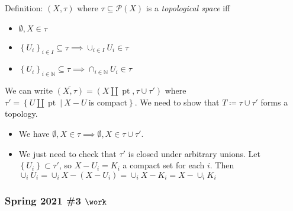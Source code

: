 \begin{concept}

\envlist

Definition: \((X, \tau)\) where \(\tau \subseteq \mathcal P(X)\) is a
\emph{topological space} iff

\begin{itemize}
\tightlist
\item
  \(\emptyset, X \in \tau\)
\item
  \(\left\{{U_i}\right\}_{i\in I} \subseteq \tau \implies \cup_{i\in I} U_i \in \tau\)
\item
  \(\left\{{U_i}\right\}_{i\in {\mathbb{N}}} \subseteq \tau \implies \cap_{i\in {\mathbb{N}}} U_i \in \tau\)
\end{itemize}

\end{concept}

\begin{solution}

\envlist

We can write
\(\overline{(X, \tau)} = (X {\textstyle\coprod}{\operatorname{pt}}, \tau \cup\tau')\)
where
\(\tau' = \left\{{U{\textstyle\coprod}{\operatorname{pt}}{~\mathrel{\Big|}~}X-U ~\text{is compact}}\right\}\).
We need to show that \(T \coloneqq\tau \cup\tau'\) forms a topology.

\begin{itemize}
\tightlist
\item
  We have
  \(\emptyset,X \in \tau \implies \emptyset, X \in \tau \cup\tau'\).
\item
  We just need to check that \(\tau'\) is closed under arbitrary unions.
  Let \(\left\{{U_i}\right\} \subset \tau'\), so \(X-U_i = K_i\) a
  compact set for each \(i\). Then
  \(\cup_{i} U_i = \cup_i X- (X-U_i)= \cup_i X - K_i = X - \cup_i K_i\)
\end{itemize}

\end{solution}

\hypertarget{spring-2021-3-work}{%
\subsubsection{\texorpdfstring{Spring 2021 \#3
\(\work\)}{Spring 2021 \#3 \textbackslash work}}\label{spring-2021-3-work}}

